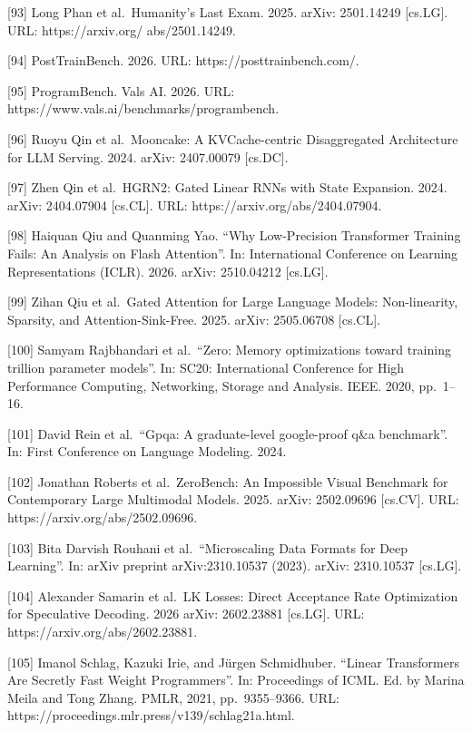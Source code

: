 \documentclass[
  10
]{article}
\begin{document}
{[}93{]} Long Phan et al.~Humanity's Last Exam. 2025. arXiv: 2501.14249
{[}cs.LG{]}. URL: https://arxiv.org/ abs/2501.14249.

{[}94{]} PostTrainBench. 2026. URL: https://posttrainbench.com/.

{[}95{]} ProgramBench. Vals AI. 2026. URL:
https://www.vals.ai/benchmarks/programbench.

{[}96{]} Ruoyu Qin et al.~Mooncake: A KVCache-centric Disaggregated
Architecture for LLM Serving. 2024. arXiv: 2407.00079 {[}cs.DC{]}.

{[}97{]} Zhen Qin et al.~HGRN2: Gated Linear RNNs with State Expansion.
2024. arXiv: 2404.07904 {[}cs.CL{]}. URL:
https://arxiv.org/abs/2404.07904.

{[}98{]} Haiquan Qiu and Quanming Yao. ``Why Low-Precision Transformer
Training Fails: An Analysis on Flash Attention''. In: International
Conference on Learning Representations (ICLR). 2026. arXiv: 2510.04212
{[}cs.LG{]}.

{[}99{]} Zihan Qiu et al.~Gated Attention for Large Language Models:
Non-linearity, Sparsity, and Attention-Sink-Free. 2025. arXiv:
2505.06708 {[}cs.CL{]}.

{[}100{]} Samyam Rajbhandari et al.~``Zero: Memory optimizations toward
training trillion parameter models''. In: SC20: International Conference
for High Performance Computing, Networking, Storage and Analysis. IEEE.
2020, pp.~1--16.

{[}101{]} David Rein et al.~``Gpqa: A graduate-level google-proof q\&a
benchmark''. In: First Conference on Language Modeling. 2024.

{[}102{]} Jonathan Roberts et al.~ZeroBench: An Impossible Visual
Benchmark for Contemporary Large Multimodal Models. 2025. arXiv:
2502.09696 {[}cs.CV{]}. URL: https://arxiv.org/abs/2502.09696.

{[}103{]} Bita Darvish Rouhani et al.~``Microscaling Data Formats for
Deep Learning''. In: arXiv preprint arXiv:2310.10537 (2023). arXiv:
2310.10537 {[}cs.LG{]}.

{[}104{]} Alexander Samarin et al.~LK Losses: Direct Acceptance Rate
Optimization for Speculative Decoding. 2026 arXiv: 2602.23881
{[}cs.LG{]}. URL: https://arxiv.org/abs/2602.23881.

{[}105{]} Imanol Schlag, Kazuki Irie, and Jürgen Schmidhuber. ``Linear
Transformers Are Secretly Fast Weight Programmers''. In: Proceedings of
ICML. Ed. by Marina Meila and Tong Zhang. PMLR, 2021, pp.~9355--9366.
URL: https://proceedings.mlr.press/v139/schlag21a.html.
\end{document}
